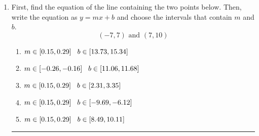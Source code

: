 \documentclass[14pt]{extbook}
\newcommand{\litem}[1]{\item#1\hspace*{-1cm}\rule{\textwidth}{0.4pt}}
\begin{document}
\begin{enumerate}
{\begin{enumerate}[label=\Alph*.]
\end{enumerate} }
\litem{
First, find the equation of the line containing the two points below. Then, write the equation as $ y=mx+b $ and choose the intervals that contain $m$ and $b$.\[ (-7, 7) \text{ and } (7, 10) \]\begin{enumerate}[label=\Alph*.]
\item \( m \in [0.15, 0.29] \hspace*{3mm} b \in [13.73, 15.34] \)
\item \( m \in [-0.26, -0.16] \hspace*{3mm} b \in [11.06, 11.68] \)
\item \( m \in [0.15, 0.29] \hspace*{3mm} b \in [2.31, 3.35] \)
\item \( m \in [0.15, 0.29] \hspace*{3mm} b \in [-9.69, -6.12] \)
\item \( m \in [0.15, 0.29] \hspace*{3mm} b \in [8.49, 10.11] \)

\end{enumerate} }
\end{enumerate}
\end{document}
